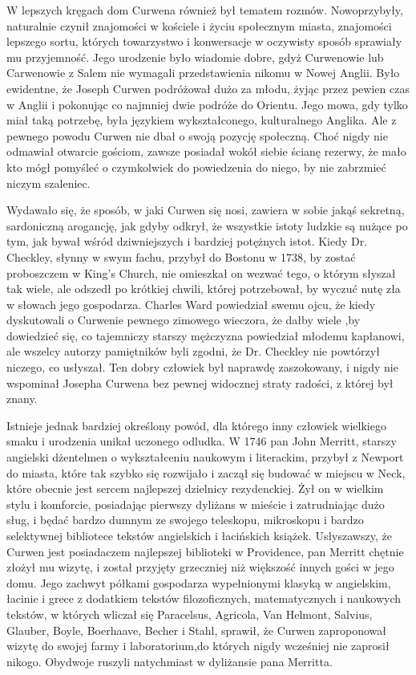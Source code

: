 W lepszych kręgach dom Curwena również był tematem rozmów. Nowoprzybyły,  naturalnie czynił znajomości w kościele i życiu społecznym miasta, znajomości lepszego sortu, których towarzystwo i konwersacje w oczywisty sposób sprawiały mu przyjemność. Jego urodzenie było wiadomie dobre, gdyż Curwenowie lub Carwenowie z Salem nie wymagali przedstawienia nikomu w Nowej Anglii. Było ewidentne, że Joseph Curwen podróżował dużo za młodu, żyjąc przez pewien czas w Anglii i pokonując co najmniej dwie podróże do Orientu. Jego mowa, gdy tylko miał taką potrzebę, była językiem wykształconego, kulturalnego Anglika. Ale z pewnego powodu Curwen nie dbał o swoją pozycję społeczną. Choć nigdy nie odmawiał otwarcie gościom, zawsze posiadał wokół siebie ścianę rezerwy, że mało kto mógł pomyśleć o czymkolwiek do powiedzenia do niego, by nie zabrzmieć niczym szaleniec. 

Wydawało się, że sposób, w jaki Curwen się nosi, zawiera w sobie jakąś sekretną, sardoniczną arogancję, jak gdyby odkrył, że wszystkie istoty ludzkie są nużące po tym, jak bywał wśród dziwniejszych i bardziej potężnych istot. Kiedy Dr. Checkley, słynny w swym fachu, przybył do Bostonu w 1738, by zostać proboszczem w King's Church, nie omieszkał on wezwać tego, o którym słyszał tak wiele, ale odszedł po krótkiej chwili, której potrzebował, by wyczuć nutę zła w słowach jego gospodarza. Charles Ward powiedział swemu ojcu, że kiedy dyskutowali o Curwenie pewnego zimowego wieczora, że dałby wiele ,by dowiedzieć się, co tajemniczy starszy mężczyzna powiedział młodemu kapłanowi, ale wszelcy autorzy pamiętników byli zgodni, że Dr. Checkley nie powtórzył niczego, co usłyszał. Ten dobry człowiek był naprawdę zaszokowany, i nigdy nie wspominał Josepha Curwena bez pewnej widocznej straty radości, z której był znany.

Istnieje jednak bardziej określony powód, dla którego inny człowiek wielkiego smaku i urodzenia unikał uczonego odludka. W 1746 pan John Merritt, starszy angielski dżentelmen o wykształceniu naukowym i literackim, przybył z Newport do miasta, które tak szybko się rozwijało i zaczął się budować w miejscu w Neck, które obecnie jest sercem najlepszej dzielnicy rezydenckiej. Żył on w wielkim stylu i komforcie, posiadając pierwszy dyliżans w mieście i zatrudniając dużo sług, i będać bardzo dumnym ze swojego teleskopu, mikroskopu i bardzo selektywnej bibliotece tekstów angielskich i łacińskich książek. Usłyszawszy, że Curwen jest posiadaczem najlepszej biblioteki w Providence, pan Merritt chętnie złożył mu wizytę, i został przyjęty grzeczniej niż większość innych gości w jego domu. Jego zachwyt półkami gospodarza wypełnionymi klasyką w angielskim, łacinie i grece z dodatkiem tekstów filozoficznych, matematycznych i naukowych tekstów, w których wliczał się Paracelsus, Agricola, Van Helmont, Salvius, Glauber, Boyle, Boerhaave, Becher i Stahl, sprawił, że Curwen zaproponował wizytę do swojej farmy i laboratorium,do których nigdy wcześniej nie zaprosił nikogo. Obydwoje ruszyli natychmiast w dyliżansie pana Merritta.

